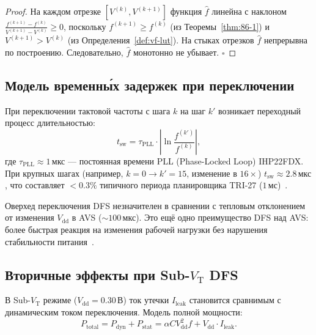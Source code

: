 \begin{proof}
На каждом отрезке $[V^{(k)}, V^{(k+1)}]$ функция $\hat{f}$ линейна
с наклоном $\frac{f^{(k+1)} - f^{(k)}}{V^{(k+1)} - V^{(k)}} \geq 0$,
поскольку $f^{(k+1)} \geq f^{(k)}$ (из Теоремы~\ref{thm:86-1}) и
$V^{(k+1)} > V^{(k)}$ (из Определения~\ref{def:vf-lut}).
На стыках отрезков $\hat{f}$ непрерывна по построению.
Следовательно, $\hat{f}$ монотонно не убывает.
\hfill\ensuremath{\square}
\end{proof}

\subsection{Модель временн\'ых задержек при переключении}
\label{subsec:switching-delay-model}

При переключении тактовой частоты с шага $k$ на шаг $k'$
возникает переходный процесс длительностью:
\begin{equation}
  t_{\mathrm{sw}} = \tau_{\mathrm{PLL}} \cdot
  \left|\ln\frac{f^{(k')}}{f^{(k)}}\right|,
  \label{eq:switching-time}
\end{equation}
где $\tau_{\mathrm{PLL}} \approx 1\,\text{мкс}$ — постоянная времени
PLL (Phase-Locked Loop) IHP22FDX.  При крупных шагах (например,
$k=0 \to k'=15$, изменение в $16\times$) $t_{\mathrm{sw}} \approx 2{.}8\,\text{мкс}$,
что составляет $< 0{.}3\%$ типичного периода планировщика
TRI-27 ($1\,\text{мс}$)~\cite{Hennessy-Patterson-CA6}.

\begin{remark}
\label{rem:dfs-overhead}
Оверхед переключения DFS незначителен в сравнении с тепловым
отклонением от изменения $V_{\mathrm{dd}}$ в AVS ($\sim 100\,\text{мкс}$).
Это ещё одно преимущество DFS над AVS: более быстрая реакция на
изменения рабочей нагрузки без нарушения стабильности питания~\cite{Rabaey-DIC2}.
\end{remark}

\subsection{Вторичные эффекты при Sub-$V_{\mathrm{T}}$ DFS}
\label{subsec:subvt-secondary}

В Sub-$V_{\mathrm{T}}$ режиме ($V_{\mathrm{dd}} = 0{.}30\,\text{В}$)
ток утечки $I_{\mathrm{leak}}$ становится сравнимым с динамическим
током переключения.  Модель полной мощности:
\begin{equation}
  P_{\mathrm{total}} = P_{\mathrm{dyn}} + P_{\mathrm{stat}}
  = \alpha C V_{\mathrm{dd}}^2 f + V_{\mathrm{dd}} \cdot I_{\mathrm{leak}}.
  \label{eq:total-power}
\end{equation}


